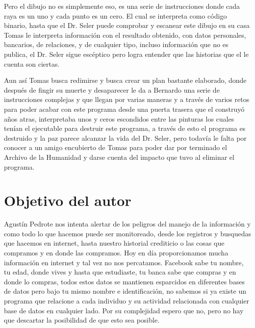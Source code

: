 \documentclass[paper=letter, fontsize=12pt]{scrartcl} %
\begin{document}
Pero el dibujo no es simplemente eso, es una serie de instrucciones donde cada raya es un uno y cada punto es un cero. El cual se interpreta como código binario, hasta que el Dr. Seler puede comprobar y escanear este dibujo en su casa Tomas le interpreta información con el resultado obtenido, con datos personales, bancarios, de relaciones, y de cualquier tipo, incluso información que no es publica, el Dr. Seler sigue escéptico pero logra entender que las historias que el le cuenta son ciertas.\vspace{4mm}

Aun así Tomas busca redimirse y busca crear un plan bastante elaborado, donde después de fingir su muerte y desaparecer le da a Bernardo una serie de instrucciones complejas y que llegan por varias maneras y a través de varios retos para poder acabar con este programa desde una puerta trasera que el construyó años atras, interpretaba unos y ceros escondidos entre las pinturas los cuales tenían el ejecutable para destruir este programa, a través de esto el programa es destruido y la paz parece alcanzar la vida del Dr. Seler, pero todavía le falta por conocer a un amigo encubierto de Tomas para poder dar por terminado el Archivo de la Humanidad y darse cuenta del impacto que tuvo al eliminar el programa.\vspace{4mm}


\section*{Objetivo del autor}

Agustín Pedrote nos intenta alertar de los peligros del manejo de la información y como todo lo que hacemos puede ser monitoreado, desde los registros y busquedas que hacemos en internet, hasta nuestro historial crediticio o las cosas que compramos y en donde las compramos. Hoy en día proporcionamos mucha información en internet y tal vez no nos percatamos. Facebook sabe tu nombre, tu edad, donde vives y hasta que estudiaste, tu banca sabe que compras y en donde lo compras, todos estos datos se mantienen esparcidos en diferentes bases de datos pero bajo tu mismo nombre e identificación, no sabemos si ya existe un programa que relacione a cada individuo y su actividad relacionada con cualquier base de datos en cualquier lado. Por su complejidad espero que no, pero no hay que descartar la posibilidad de que esto sea posible.

\end{document}
